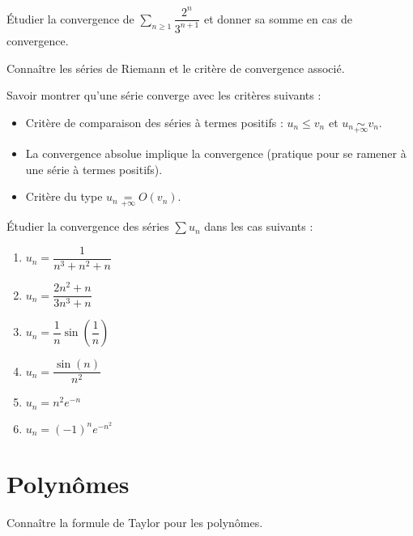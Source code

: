 \documentclass[a4paper,twoside,french,10pt]{VcCours}
\begin{document}
\medskip

\begin{Exercice}{}\end{Exercice} Étudier la convergence de $\sum_{n \geq 1} \dfrac{2^n}{3^{n+1}}$ et donner sa somme en cas de convergence.

\medskip

\begin{ptc}{}
	Connaître les séries de Riemann et le critère de convergence associé.
\end{ptc} 

\begin{ptc}{}
	Savoir montrer qu'une série converge avec les critères suivants : 
\begin{itemize}
\item Critère de comparaison des séries à termes positifs : $u_n \leq v_n$ et $u_n \underset{+ \infty}{\sim} v_n$.
\item La convergence absolue implique la convergence (pratique pour se ramener à une série à termes positifs).
\item Critère du type $u_n \underset{+ \infty}{=} O (v_n)$.
\end{itemize}
\end{ptc}

\begin{Exercice}{}\end{Exercice} Étudier la convergence des séries $\sum u_n$ dans les cas suivants :

\begin{multicols}{3}
\begin{enumerate}
\item $u_n = \dfrac{1}{n^3+n^2+n}$
\item $u_n = \dfrac{2n^2+n}{3n^3+n}$
\columnbreak
\item $u_n = \dfrac{1}{n} \sin \left( \dfrac{1}{n} \right)$
\item $u_n = \dfrac{\sin(n)}{n^2} $
\columnbreak
\item $u_n = n^2 e^{-n}$
\item $u_n = (-1)^n e^{-n^2}$
\end{enumerate}
\end{multicols}

\bigskip

\section{Polynômes}

\begin{ptc}{}
	Connaître la formule de Taylor pour les polynômes.
\end{ptc}
\end{document}
